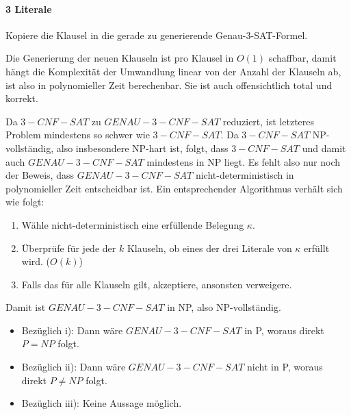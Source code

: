 \paragraph{3 Literale}
Kopiere die Klausel in die gerade zu generierende Genau-3-SAT-Formel.
\par

Die Generierung der neuen Klauseln ist pro Klausel in $O(1)$ schaffbar, damit
hängt die Komplexität der Umwandlung linear von der Anzahl der Klauseln ab, ist
also in polynomieller Zeit berechenbar. Sie ist auch offensichtlich total und
korrekt.

Da $3-CNF-SAT$ zu $GENAU-3-CNF-SAT$ reduziert, ist letzteres Problem mindestens
so schwer wie $3-CNF-SAT$. Da $3-CNF-SAT$ NP-vollständig, also insbesondere
NP-hart ist, folgt, dass $3-CNF-SAT$ und damit auch $GENAU-3-CNF-SAT$ mindestens
in NP liegt. Es fehlt also nur noch der Beweis, dass $GENAU-3-CNF-SAT$
nicht-deterministisch in polynomieller Zeit entscheidbar ist. Ein entsprechender
Algorithmus verhält sich wie folgt:
\begin{enumerate}
	\item
		Wähle nicht-deterministisch eine erfüllende Belegung $\kappa$.
	\item
		Überprüfe für jede der $k$ Klauseln, ob eines der drei Literale
		von $\kappa$ erfüllt wird. ($O(k)$)
	\item
		Falls das für alle Klauseln gilt, akzeptiere, ansonsten
		verweigere.
\end{enumerate}

Damit ist $GENAU-3-CNF-SAT$ in NP, also NP-vollständig.

\begin{itemize}
	\item
		Bezüglich i): Dann wäre $GENAU-3-CNF-SAT$ in P, woraus direkt $P = NP$ folgt.
	\item
		Bezüglich ii): Dann wäre $GENAU-3-CNF-SAT$ nicht in P, woraus
		direkt $P \neq NP$ folgt.
	\item
		Bezüglich iii): Keine Aussage möglich.
\end{itemize}
